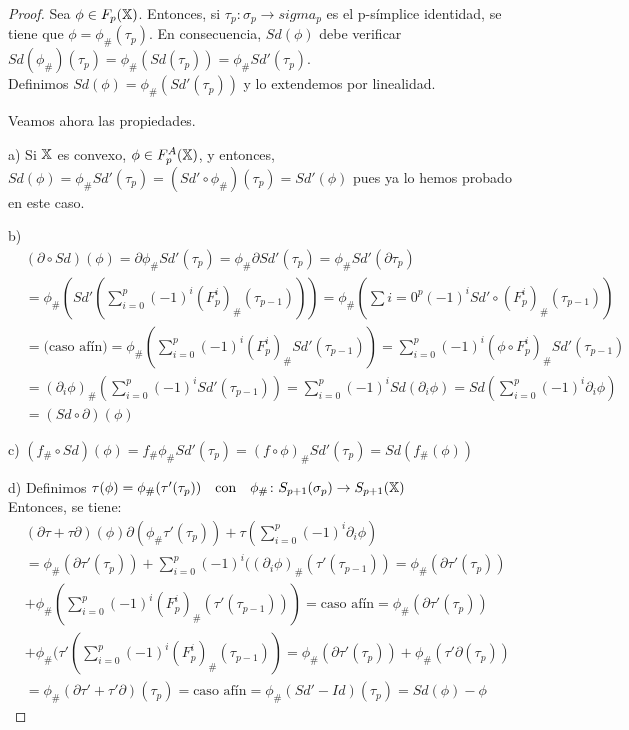\begin{proof}
  Sea $\phi \in F_p({\mathbb X})$. Entonces, si $\tau_p \colon \sigma_p \to sigma_p$ es el p-símplice identidad, se tiene que
  $\phi = \phi_\#(\tau_p)$. En consecuencia, $Sd(\phi)$ debe verificar $Sd(\phi_\#)(\tau_p) = \phi_\#(Sd(\tau_p)) = \phi_\# Sd'(\tau_p)$. \\
  Definimos $Sd(\phi) = \phi_\#(Sd'(\tau_p))$ y lo extendemos por linealidad.

  Veamos ahora las propiedades.

  a) Si ${\mathbb X}$ es convexo, $\phi \in F_p^A({\mathbb X})$, y entonces, $Sd(\phi) = \phi_\# Sd'(\tau_p) = (Sd' \circ \phi_\#)(\tau_p) = Sd'(\phi)$
  pues ya lo hemos probado en este caso.

  b) \begin{align*}
    &(\partial \circ Sd)(\phi) = \partial \phi_\# Sd'(\tau_p) = \phi_\# \partial Sd'(\tau_p) = \phi_\# Sd'(\partial \tau_p) \\
    &= \phi_\#(Sd'(\sum\limits_{i = 0}^p (-1)^i (F_p^i)_\# (\tau_{p-1}))) = \phi_\#(\sum\limits{i = 0}^p (-1)^i Sd' \circ (F_p^i)_\#(\tau_{p-1}))\\
    &= \text{(caso afín)} = \phi_\#(\sum\limits_{i = 0}^p (-1)^i (F_p^i)_\# Sd'(\tau_{p-1})) = \sum\limits_{i = 0}^p (-1)^i (\phi \circ F_p^i)_\# Sd'(\tau_{p-1}) \\
    &= (\partial_i \phi)_\# (\sum\limits_{i = 0}^p (-1)^i Sd'(\tau_{p-1})) = \sum\limits_{i = 0}^p (-1)^i Sd(\partial_i \phi) = Sd(\sum\limits_{i = 0}^p (-1)^i \partial_i \phi) \\
    &= (Sd \circ \partial)(\phi)
  \end{align*}

  c) $(f_\# \circ Sd)(\phi) = f_\# \phi_\# Sd'(\tau_p) = (f \circ \phi)_\# Sd'(\tau_p) = Sd(f_\#(\phi))$

  d) Definimos $\tau(\phi) = \phi_\#(\tau'(\tau_p)) \quad \text{con} \quad \phi_\# \colon S_{p+1}(\sigma_p) \to S_{p+1}({\mathbb X})$ \\
  Entonces, se tiene:
  \begin{align*}
    &(\partial \tau + \tau \partial)(\phi) \partial(\phi_\# \tau'(\tau_p)) + \tau(\sum\limits_{i = 0}^p (-1)^i \partial_i \phi) \\
    &= \phi_\#(\partial \tau'(\tau_p)) + \sum\limits_{i = 0}^p (-1)^i((\partial_i \phi)_\#(\tau'(\tau_{p-1})) = \phi_\#(\partial \tau'(\tau_p)) \\
    &+ \phi_\#(\sum\limits_{i = 0}^p (-1)^i (F_p^i)_\# (\tau'(\tau_{p-1}))) = \text{caso afín} = \phi_\#(\partial \tau'(\tau_p)) \\
    &+ \phi_\#(\tau'(\sum\limits_{i = 0}^p (-1)^i (F_p^i)_\#(\tau_{p-1})) = \phi_\#(\partial \tau'(\tau_p)) + \phi_\#(\tau'\partial(\tau_p)) \\
    &= \phi_\#(\partial \tau' + \tau' \partial)(\tau_p) = \text{caso afín} = \phi_\#(Sd' - Id)(\tau_p) = Sd(\phi) - \phi
  \end{align*}


\end{proof}
